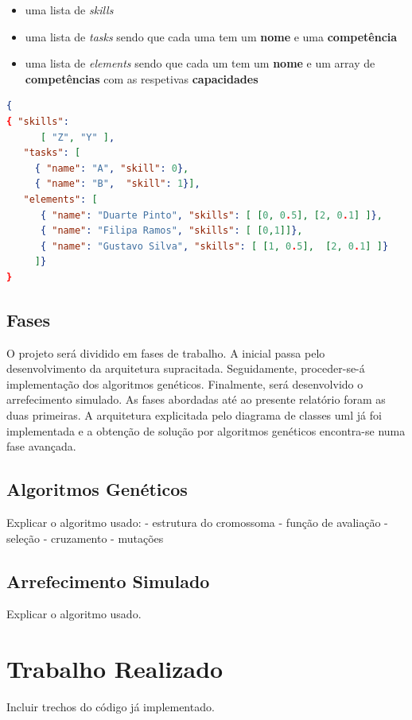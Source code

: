 \begin{titlepage}
\begin{itemize}
 	\item uma lista de \textit{skills}
	\item uma lista de \textit{tasks} sendo que cada uma tem um \textbf{nome} e uma \textbf{competência}
	\item uma lista de \textit{elements} sendo que cada um tem um \textbf{nome} e um array de \textbf{competências} com as respetivas \textbf{capacidades}
\end{itemize}

\begin{lstlisting}[language=json,firstnumber=1]
{ 
{ "skills": 
      [ "Z", "Y" ], 
   "tasks": [
     { "name": "A", "skill": 0},
     { "name": "B",  "skill": 1}],
   "elements": [
      { "name": "Duarte Pinto", "skills": [ [0, 0.5], [2, 0.1] ]},
      { "name": "Filipa Ramos", "skills": [ [0,1]]},
      { "name": "Gustavo Silva", "skills": [ [1, 0.5],  [2, 0.1] ]}
     ]}
}
\end{lstlisting}

\subsection{Fases}
\justify\normalsize 
O projeto será dividido em fases de trabalho. A inicial passa pelo desenvolvimento da arquitetura supracitada. Seguidamente, proceder-se-á implementação dos  algoritmos genéticos. Finalmente, será desenvolvido o arrefecimento simulado. As fases abordadas até ao presente relatório foram as duas primeiras. A arquitetura explicitada pelo diagrama de classes uml já foi implementada e a obtenção de solução por algoritmos genéticos encontra-se numa fase avançada.

\subsection{Algoritmos Genéticos}
\justify\normalsize
Explicar o algoritmo usado:
	- estrutura do cromossoma
	- função de avaliação
	- seleção
	- cruzamento
	- mutações

\subsection{Arrefecimento Simulado}
\justify\normalsize
Explicar o algoritmo usado.

\section{Trabalho Realizado}
\justify\normalsize
Incluir trechos do código já implementado.


\end{titlepage}
